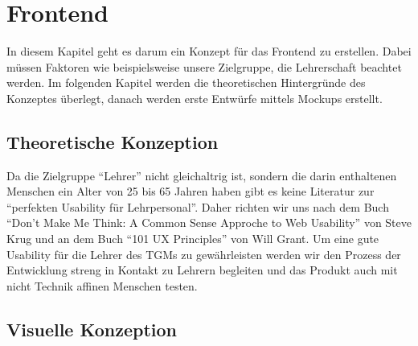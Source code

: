 \section{Frontend}
In diesem Kapitel geht es darum ein Konzept für das Frontend zu erstellen. Dabei müssen Faktoren wie beispielsweise unsere Zielgruppe, die Lehrerschaft beachtet werden. Im folgenden Kapitel werden die theoretischen Hintergründe des Konzeptes überlegt, danach werden erste Entwürfe mittels Mockups erstellt. 
\subsection{Theoretische Konzeption}
Da die Zielgruppe \enquote{Lehrer} nicht gleichaltrig ist, sondern die darin enthaltenen Menschen ein Alter von 25 bis 65 Jahren haben gibt es keine Literatur zur \enquote{perfekten Usability für Lehrpersonal}. Daher richten wir uns nach dem Buch \enquote{Don't Make Me Think: A Common Sense Approche to Web Usability} von Steve Krug und an dem Buch \enquote{101 UX Principles} von Will Grant. Um eine gute Usability für die Lehrer des TGMs zu gewährleisten werden wir den Prozess der Entwicklung streng in Kontakt zu Lehrern begleiten und das Produkt auch mit nicht Technik affinen Menschen testen.  
\subsection{Visuelle Konzeption}
